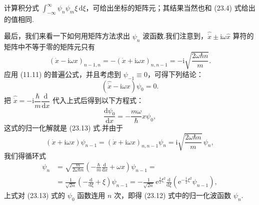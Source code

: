 计算积分式 $\int_{-\infty}^{\infty}\psi_n\psi_m\xi\,\mathrm{d}\xi$，可给出坐标的矩阵元；其结果当然也和 (23.4) 式给出的值相同.

最后，我们来看一下如何用矩阵方法求出 $\psi_n$ 波函数.我们注意到，$\hat{\dot{x}}\pm\mathrm{i}\omega\hat{x}$ 算符的矩阵中不等于零的矩阵元只有
\begin{equation}
  \left(\dot{x}-\mathrm{i}\omega x\right)_{n-1,n}
  =-\left(\dot{x}+\mathrm{i}\omega x\right)_{n,n-1}
  =-\mathrm{i}\sqrt{\frac{2\omega\hbar n}{m}}.
\end{equation}
应用 (11.11) 的普遍公式，并且考虑到 $\psi_{-1}\equiv 0$，可得下列结论：
\begin{equation*}
  \left(\hat{\dot{x}}-\mathrm{i}\omega x\right)\psi_0=0.
\end{equation*}
把 $\hat{\dot{x}}=-\mathrm{i}\dfrac{\hbar}{m}\dfrac{\mathrm{d}}{\mathrm{d}x}$ 代入上式后得到以下方程式：
\begin{equation*}
  \frac{\mathrm{d}\psi_0}{\mathrm{d}x}
  =-\frac{m\omega}{\hbar}x\psi_0,
\end{equation*}
这式的归一化解就是 (23.13) 式.并由于
\begin{equation*}
  \left(\dot{x}+\mathrm{i}\omega x\right)\psi_{n-1}
  =\left(\dot{x}+\mathrm{i}\omega x\right)_{n,n-1}\psi_n
  =\mathrm{i}\sqrt{\frac{2\omega\hbar n}{m}}\,\psi_n,
\end{equation*}
我们得循环式
\begin{equation*}
\begin{aligned}
  \psi_n
  &=\sqrt{\frac{m}{2\omega\hbar n}}
  \left(-\frac{\hbar}{m}\frac{\mathrm{d}}{\mathrm{d}x}+\omega x\right)\psi_{n-1}
  =\\
  &=\frac{1}{\sqrt{2n}}\left(-\frac{\mathrm{d}}{\mathrm{d}\xi}+\xi\right)\psi_{n-1}
  =-\frac{1}{\sqrt{2n}}\,
  \mathrm{e}^{\frac{1}{2}\xi^2}\frac{\mathrm{d}}{\mathrm{d}\xi}
  \left(\mathrm{e}^{-\frac{1}{2}\xi^2}\psi_{n-1}\right),
\end{aligned}
\end{equation*}
上式对 (23.13) 式的 $\psi_0$ 函数连用 $n$ 次，即得 (23.12) 式中的归一化波函数 $\psi_n$.

